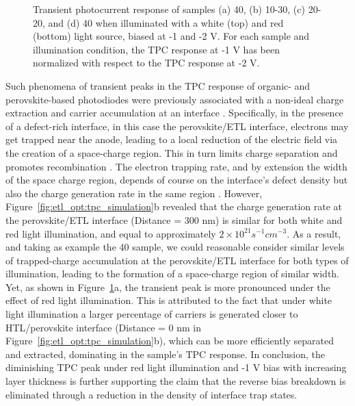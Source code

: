 \begin{figure}[htbp]
    \caption[Transient photocurrent response of samples 40, 10-30, 20-20, or 40 as the ETL.]{Transient photocurrent response of samples (a) 40, (b) 10-30, (c) 20-20, and (d) 40 when illuminated with a white (top) and red (bottom) light source, biased at -1 and -2 V. For each sample and illumination condition, the TPC response at -1 V has been normalized with respect to the TPC response at -2 V.}
    \label{fig:etl_opt:tpc_comparison}
\end{figure}

Such phenomena of transient peaks in the TPC response of organic- and perovskite-based photodiodes were previously associated with a non-ideal charge extraction and carrier accumulation at an interface \cite{Neophytou2019EnhancingLayer, Hwang2009Drift-diffusionCells,Mcneill2009PhotocurrentEffects}. Specifically, in the presence of a defect-rich interface, in this case the perovskite/ETL interface, electrons may get trapped near the anode, leading to a local reduction of the electric field via the creation of a space-charge region. This in turn limits charge separation and promotes recombination \cite{Mcneill2009PhotocurrentEffects}. The electron trapping rate, and by extension the width of the space charge region, depends of course on the interface's defect density but also the charge generation rate in the same region \cite{Hwang2009Drift-diffusionCells}. However, Figure~\ref{fig:etl_opt:tpc_simulation}b revealed that the charge generation rate at the perovskite/ETL interface (Distance = 300 nm) is similar for both white and red light illumination, and equal to approximately $2\times 10^{21}s^{-1}cm^{-3}$. As a result, and taking as example the 40 sample, we could reasonable consider similar levels of trapped-charge accumulation at the perovskite/ETL interface for both types of illumination, leading to the formation of a space-charge region of similar width. Yet, as shown in Figure~\ref{fig:etl_opt:tpc_comparison}a, the transient peak is more pronounced under the effect of red light illumination. This is attributed to the fact that under white light illumination a larger percentage of carriers is generated closer to HTL/perovskite interface (Distance = 0 nm in Figure~\ref{fig:etl_opt:tpc_simulation}b), which can be more efficiently separated and extracted, dominating in the sample's TPC response. In conclusion, the diminishing TPC peak under red light illumination and -1 V bias with increasing  layer thickness is further supporting the claim that the reverse bias breakdown is eliminated through a reduction in the density of interface trap states.

